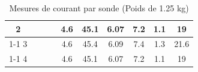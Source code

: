 \begin{table}[H]
{\begin{tabular}{|c|c|c|c|c|c|c|c|c|c|}
            2         &                                                            &                           &                                                                                        & 4.6                                                      & 45.1                                                    & 6.07                                                                & 7.2                                                              & 1.1    & 19                                                                 \\ \cline{1-1} \cline{5-10}
            3         &                                                            &                           &                                                                                        & 4.6                                                      & 45.4                                                    & 6.09                                                                & 7.4                                                              & 1.3    & 21.6                                                               \\ \cline{1-1} \cline{5-10}
            4         &                                                            &                           &                                                                                        & 4.6                                                      & 45.1                                                    & 6.07                                                                & 7.2                                                              & 1.1    & 19                                                                 \\ \hline
        \end{tabular}%
    }
    \caption{Mesures de courant par sonde (Poids de 1.25 kg)}
    \label{tab:poids_1_25_sonde}
\end{table}

